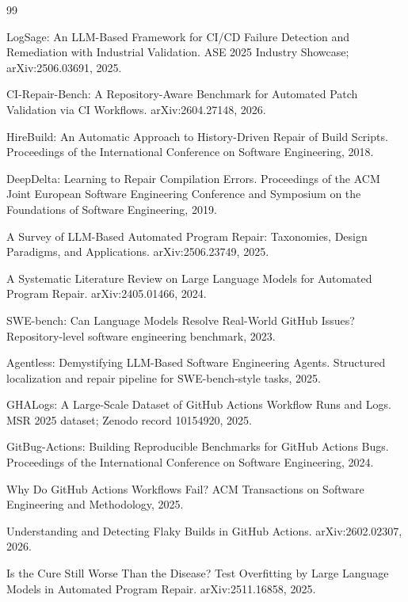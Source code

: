 \begin{thebibliography}{99}

LogSage: An LLM-Based Framework for CI/CD Failure Detection and Remediation with Industrial Validation.
ASE 2025 Industry Showcase; arXiv:2506.03691, 2025.

CI-Repair-Bench: A Repository-Aware Benchmark for Automated Patch Validation via CI Workflows.
arXiv:2604.27148, 2026.

HireBuild: An Automatic Approach to History-Driven Repair of Build Scripts.
Proceedings of the International Conference on Software Engineering, 2018.

DeepDelta: Learning to Repair Compilation Errors.
Proceedings of the ACM Joint European Software Engineering Conference and Symposium on the Foundations of Software Engineering, 2019.

A Survey of LLM-Based Automated Program Repair: Taxonomies, Design Paradigms, and Applications.
arXiv:2506.23749, 2025.

A Systematic Literature Review on Large Language Models for Automated Program Repair.
arXiv:2405.01466, 2024.

SWE-bench: Can Language Models Resolve Real-World GitHub Issues?
Repository-level software engineering benchmark, 2023.

Agentless: Demystifying LLM-Based Software Engineering Agents.
Structured localization and repair pipeline for SWE-bench-style tasks, 2025.

GHALogs: A Large-Scale Dataset of GitHub Actions Workflow Runs and Logs.
MSR 2025 dataset; Zenodo record 10154920, 2025.

GitBug-Actions: Building Reproducible Benchmarks for GitHub Actions Bugs.
Proceedings of the International Conference on Software Engineering, 2024.

Why Do GitHub Actions Workflows Fail?
ACM Transactions on Software Engineering and Methodology, 2025.

Understanding and Detecting Flaky Builds in GitHub Actions.
arXiv:2602.02307, 2026.

Is the Cure Still Worse Than the Disease? Test Overfitting by Large Language Models in Automated Program Repair.
arXiv:2511.16858, 2025.


\end{thebibliography}

